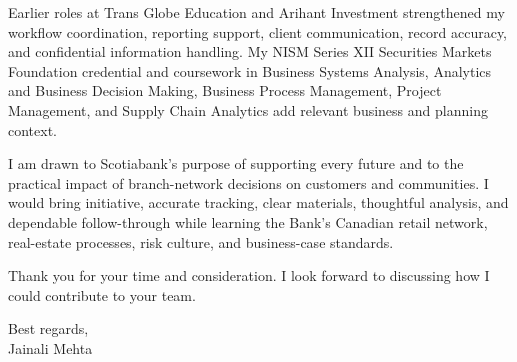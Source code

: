 \documentclass[letterpaper,10pt]{article}
\begin{document}
Earlier roles at Trans Globe Education and Arihant Investment strengthened my workflow coordination, reporting support, client communication, record accuracy, and confidential information handling. My NISM Series XII Securities Markets Foundation credential and coursework in Business Systems Analysis, Analytics and Business Decision Making, Business Process Management, Project Management, and Supply Chain Analytics add relevant business and planning context.

I am drawn to Scotiabank's purpose of supporting every future and to the practical impact of branch-network decisions on customers and communities. I would bring initiative, accurate tracking, clear materials, thoughtful analysis, and dependable follow-through while learning the Bank's Canadian retail network, real-estate processes, risk culture, and business-case standards.

Thank you for your time and consideration. I look forward to discussing how I could contribute to your team.

Best regards,\\[8pt]
Jainali Mehta
\end{document}
